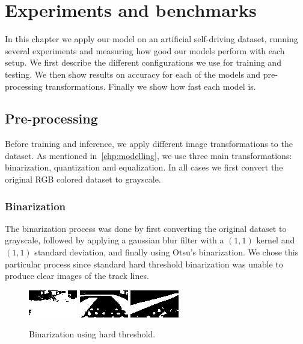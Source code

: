 
\chapter{Experiments and benchmarks}\label{chp:benchmarks}

In this chapter we apply our model on an artificial self-driving dataset, running several
experiments and measuring how good our models perform with each setup. We first describe the
different configurations we use for training and testing. We then show results on accuracy for each
of the models and pre-processing transformations. Finally we show how fast each model is.

\section{Pre-processing}

Before training and inference, we apply different image transformations to the dataset. As
mentioned in~\autoref{chp:modelling}, we use three main transformations: binarization, quantization
and equalization. In all cases we first convert the original RGB colored dataset to grayscale.

\subsection{Binarization}

The binarization process was done by first converting the original dataset to grayscale, followed
by applying a gaussian blur filter with a $(1, 1)$ kernel and $(1, 1)$ standard deviation, and
finally using Otsu's binarization. We chose this particular process since standard hard threshold
binarization was unable to produce clear images of the track lines.

\begin{figure}[h]
  \centering
  \includegraphics[scale=1.75]{imgs/binary_left_h.png}
  \includegraphics[scale=1.75]{imgs/binary_up_h.png}
  \includegraphics[scale=1.75]{imgs/binary_right_h.png}
  \caption{Binarization using hard threshold.\label{fig:bin-hard}}
\end{figure}

